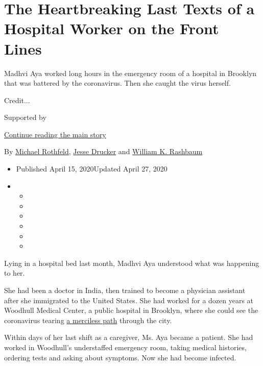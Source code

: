 \hypertarget{the-heartbreaking-last-texts-of-a-hospital-worker-on-the-front-lines}{%
\section{The Heartbreaking Last Texts of a Hospital Worker on the Front
Lines}\label{the-heartbreaking-last-texts-of-a-hospital-worker-on-the-front-lines}}

Madhvi Aya worked long hours in the emergency room of a hospital in
Brooklyn that was battered by the coronavirus. Then she caught the virus
herself.

Credit...

Supported by

\protect\hyperlink{after-sponsor}{Continue reading the main story}

By \href{https://www.nytimes3xbfgragh.onion/by/michael-rothfeld}{Michael
Rothfeld},
\href{https://www.nytimes3xbfgragh.onion/by/jesse-drucker}{Jesse
Drucker} and
\href{https://www.nytimes3xbfgragh.onion/by/william-k-rashbaum}{William
K. Rashbaum}

\begin{itemize}
\item
  Published April 15, 2020Updated April 27, 2020
\item
  \begin{itemize}
  \item
  \item
  \item
  \item
  \item
  \item
  \end{itemize}
\end{itemize}

Lying in a hospital bed last month, Madhvi Aya understood what was
happening to her.

She had been a doctor in India, then trained to become a physician
assistant after she immigrated to the United States. She had worked for
a dozen years at Woodhull Medical Center, a public hospital in Brooklyn,
where she could see the coronavirus tearing
\href{https://www.nytimes3xbfgragh.onion/2020/04/09/nyregion/coronavirus-queens-corona-jackson-heights-elmhurst.html}{a
merciless path} through the city.

Within days of her last shift as a caregiver, Ms. Aya became a patient.
She had worked in Woodhull's understaffed emergency room, taking medical
histories, ordering tests and asking about symptoms. Now she had become
infected.

